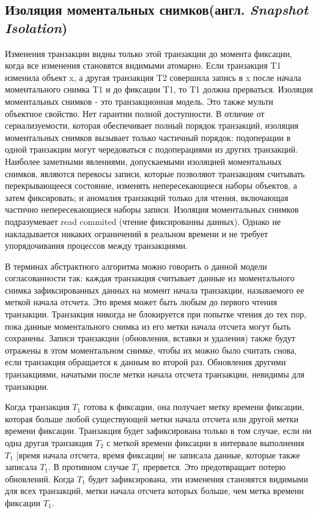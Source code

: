 \documentclass[12pt,  openany]{book}
\begin{document}
\subsection{Изоляция моментальных снимков(англ.  \textit{Snapshot Isolation})}
Изменения транзакции видны только этой транзакции до момента фиксации, когда все изменения становятся видимыми атомарно. Если транзакция T1 изменила объект x, а другая транзакция T2 совершила запись в x после начала моментального снимка T1 и до фиксации T1, то T1 должна прерваться.
Изоляция моментальных снимков - это транзакционная модель. Это также мульти объектное свойство.
Нет гарантии полной доступности. 
В отличие от сериализуемости, которая обеспечивает полный порядок транзакций, изоляция моментальных снимков вызывает только частичный порядок: подоперации в одной транзакции могут чередоваться с подоперациями из других транзакций. Наиболее заметными явлениями, допускаемыми изоляцией моментальных снимков, являются перекосы записи, которые позволяют транзакциям считывать перекрывающееся состояние, изменять непересекающиеся наборы объектов, а затем фиксировать; и аномалия транзакций только для чтения, включающая частично непересекающиеся наборы записи.
Изоляция моментальных снимков подразумевает read commited (чтение фиксированны данных). Однако не накладывается никаких ограничений в реальном времени и не требует упорядочивания процессов между транзакциями.
\par
В терминах абстрактного алгоритма можно говорить о данной модели согласованности так: каждая транзакция считывает данные из моментального снимка зафиксированных данных на момент начала транзакции, называемого ее меткой начала отсчета. Это время может быть любым до первого чтения транзакции. Транзакция никогда не блокируется при попытке чтения до тех пор, пока данные моментального снимка из его метки начала отсчета могут быть сохранены. Записи транзакции (обновления, вставки и удаления) также будут отражены в этом моментальном снимке, чтобы их можно было считать снова, если транзакция обращается к данным во второй раз. Обновления другими транзакциями, начатыми после метки начала отсчета транзакции, невидимы для транзакции. 
\par
Когда транзакция $T_1$ готова к фиксации, она получает метку времени фиксации, которая больше любой существующей метки начала отсчета или другой метки времени фиксации. Транзакция будет зафиксирована только в том случае, если ни одна другая транзакция $T_2$ с меткой времени фиксации в интервале выполнения $T_1$ [время начала отсчета, время фиксации] не записала данные, которые также записала $T_1$. В противном случае $T_1$ прервется. Это предотвращает потерю обновлений. Когда $T_1$ будет зафиксирована, эти изменения становятся видимыми для всех транзакций, метки начала отсчета которых больше, чем метка времени фиксации $T_1$.
\end{document}
